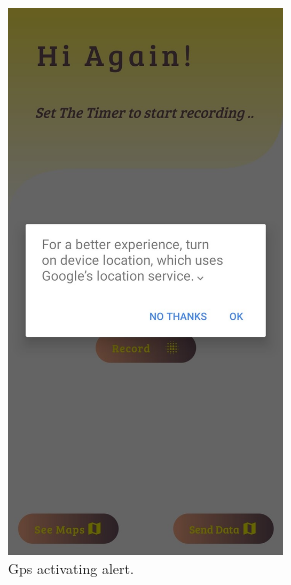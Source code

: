\begin{itemize}
\begin{figure}[h!]
\begin{subfigure}{.49\textwidth}
            \includegraphics[width=0.8\textwidth]{Images/recordingApp/askingGps.jpg}
            \caption{Gps activating alert.}
            \label{fig:GpsAcivate}
        \end{subfigure}
        \begin{subfigure}{.49\textwidth}
            \center

\end{subfigure}
\end{figure}
\end{itemize}
